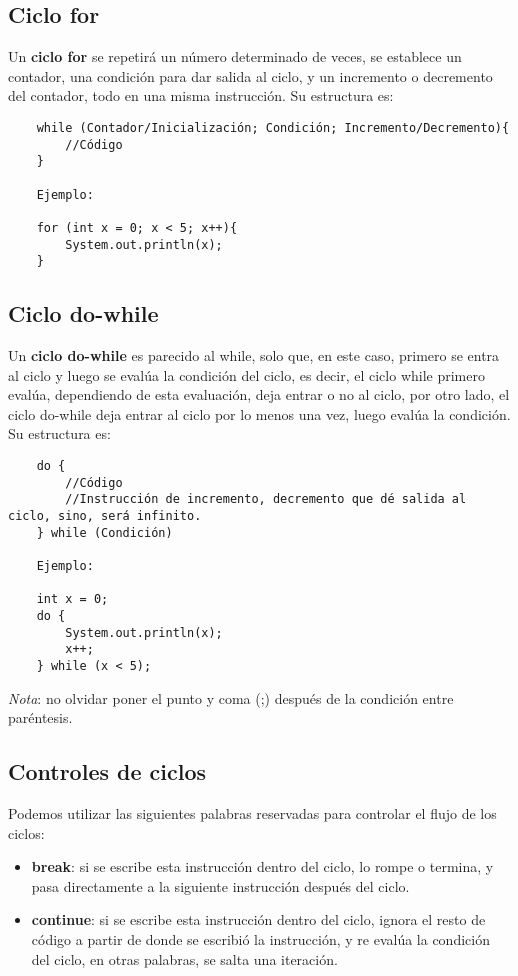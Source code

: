 \subsection{Ciclo for}
\hspace{0.55cm}Un \textbf{ciclo for} se repetirá un número determinado de veces, se establece un contador, una condición para dar salida al ciclo, y un incremento o decremento del contador, todo en una misma instrucción. Su estructura es:
\begin{lstlisting}
    while (Contador/Inicialización; Condición; Incremento/Decremento){
        //Código
    }
    
    Ejemplo:
    
    for (int x = 0; x < 5; x++){
        System.out.println(x);
    }
\end{lstlisting}


\subsection{Ciclo do-while}
\hspace{0.55cm}Un \textbf{ciclo do-while} es parecido al while, solo que, en este caso, primero se entra al ciclo y luego se evalúa la condición del ciclo, es decir, el ciclo while primero evalúa, dependiendo de esta evaluación, deja entrar o no al ciclo, por otro lado, el ciclo do-while deja entrar al ciclo por lo menos una vez, luego evalúa la condición. Su estructura es:
\begin{lstlisting}
    do {
        //Código
        //Instrucción de incremento, decremento que dé salida al ciclo, sino, será infinito.
    } while (Condición)
    
    Ejemplo:
    
    int x = 0;
    do {
        System.out.println(x);
        x++;
    } while (x < 5);
\end{lstlisting}

\textit{Nota}: no olvidar poner el punto y coma (;) después de la condición entre paréntesis.


\subsection{Controles de ciclos}
\hspace{0.55cm}Podemos utilizar las siguientes palabras reservadas para controlar el flujo de los ciclos:
\begin{itemize}
    \item \textbf{break}: si se escribe esta instrucción dentro del ciclo, lo rompe o termina, y pasa directamente a la siguiente instrucción después del ciclo.
    \item \textbf{continue}: si se escribe esta instrucción dentro del ciclo, ignora el resto de código a partir de donde se escribió la instrucción, y re evalúa la condición del ciclo, en otras palabras, se salta una iteración.
\end{itemize}

